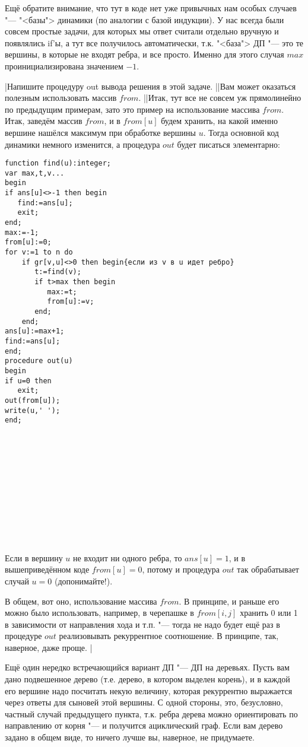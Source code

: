 Ещё обратите внимание, что тут в коде нет уже привычных нам особых случаев "--- "<базы"> динамики
(по аналогии с базой индукции). У нас всегда были совсем простые задачи, для которых мы ответ
считали отдельно вручную и появлялись if'ы, а тут все получилось автоматически, т.к. "<база"> ДП
"--- это те вершины, в которые не входят ребра, и все просто. Именно для этого случая $max$
проинициализирована значением $-1$.

\task|Напишите процедуру out вывода решения в этой задаче.
||Вам может оказаться полезным использовать массив $from$.
||Итак, тут все не совсем уж прямолинейно по предыдущим примерам, зато это пример на использование 
массива $from$. Итак, заведём массив $from$, и в $from[u]$ будем хранить, на какой именно вершине 
нашёлся максимум при обработке вершины $u$. Тогда основной код динамики немного изменится, а процедура $out$ будет писаться элементарно:
\begin{codesample}\begin{verbatim}
function find(u):integer;
var max,t,v...
begin
if ans[u]<>-1 then begin
   find:=ans[u];
   exit;
end;
max:=-1;
from[u]:=0;
for v:=1 to n do
    if gr[v,u]<>0 then begin{если из v в u идет ребро}
       t:=find(v);
       if t>max then begin
          max:=t;
          from[u]:=v;
       end;
    end;
ans[u]:=max+1;
find:=ans[u];
end;
procedure out(u)
begin
if u=0 then
   exit;
out(from[u]);
write(u,' ');
end;













\end{verbatim}
\end{codesample}
Если в вершину $u$ не входит ни одного ребра, то $ans[u]=1$, и в вышеприведённом коде $from[u]=0$, 
потому и процедура $out$ так обрабатывает случай $u=0$ (допонимайте!).

В общем, вот оно, использование массива $from$. В принципе, и раньше его можно было использовать, 
например, в черепашке в $from[i,j]$ хранить 0 или 1 в зависимости от направления хода и т.п. "--- 
тогда не надо будет ещё раз в процедуре $out$ реализовывать рекуррентное соотношение. В принципе, 
так, наверное, даже проще.
|

 Ещё один нередко встречающийся вариант ДП "--- ДП на деревьях. Пусть вам
дано подвешенное дерево (т.е. дерево, в котором выделен корень), и в каждой его вершине надо
посчитать некую величину, которая рекуррентно выражается через ответы для сыновей этой вершины. С
одной стороны, это, безусловно, частный случай предыдущего пункта, т.к. ребра дерева можно
ориентировать по направлению от корня "--- и получится ациклический граф. Если вам дерево задано в
общем виде, то ничего лучше вы, наверное, не придумаете.

